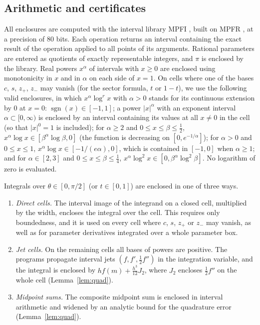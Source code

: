 \documentclass[11pt]{amsart}
\theoremstyle{definition}
\theoremstyle{remark}
\numberwithin{equation}{section}
\newcommand{\sgn}{\operatorname{sgn}}
\begin{document}
\subsection{Arithmetic and certificates}\label{sec:arith}
All enclosures are computed with the interval library MPFI \cite{MPFI}, built on MPFR \cite{MPFR}, at a precision of $80$ bits. Each operation returns an interval containing the exact result of the operation applied to all points of its arguments. Rational parameters are entered as quotients of exactly representable integers, and $\pi$ is enclosed by the library. Real powers $x^\alpha$ of intervals with $x\ge0$ are enclosed using monotonicity in $x$ and in $\alpha$ on each side of $x=1$. On cells where one of the bases $c$, $s$, $z_+$, $z_-$ may vanish (for the sector formula, $t$ or $1-t$), we use the following valid enclosures, in which $x^\alpha\log^rx$ with $\alpha>0$ stands for its continuous extension by $0$ at $x=0$: $\sgn(x)\in[-1,1]$; a power $|x|^{\alpha}$ with an exponent interval $\alpha\subset[0,\infty)$ is enclosed by an interval containing its values at all $x\ne0$ in the cell (so that $|x|^0=1$ is included); for $\alpha\ge2$ and $0\le x\le\beta\le\frac12$, $x^\alpha\log x\in[\beta^\alpha\log\beta,0]$ (the function is decreasing on $[0,e^{-1/\alpha}]$); for $\alpha>0$ and $0\le x\le 1$, $x^\alpha\log x\in[-1/(e\alpha),0]$, which is contained in $[-1,0]$ when $\alpha\ge1$; and for $\alpha\in[2,3]$ and $0\le x\le\beta\le\frac14$, $x^\alpha\log^2x\in[0,\beta^\alpha\log^2\beta]$. No logarithm of zero is evaluated.

Integrals over $\theta\in[0,\pi/2]$ (or $t\in[0,1]$) are enclosed in one of three ways.
\begin{enumerate}[label=(Q\arabic*)]
\item \emph{Direct cells.} The interval image of the integrand on a closed cell, multiplied by the width, encloses the integral over the cell. This requires only boundedness, and it is used on every cell where $c$, $s$, $z_+$ or $z_-$ may vanish, as well as for parameter derivatives integrated over a whole parameter box.
\item \emph{Jet cells.} On the remaining cells all bases of powers are positive. The programs propagate interval jets $(f,f',\frac12f'')$ in the integration variable, and the integral is enclosed by $hf(m)+\frac{h^3}{12}J_2$, where $J_2$ encloses $\frac12f''$ on the whole cell (Lemma~\ref{lem:quad}).
\item \emph{Midpoint sums.} The composite midpoint sum is enclosed in interval arithmetic and widened by an analytic bound for the quadrature error (Lemma~\ref{lem:quad}).
\end{enumerate}
\end{document}
